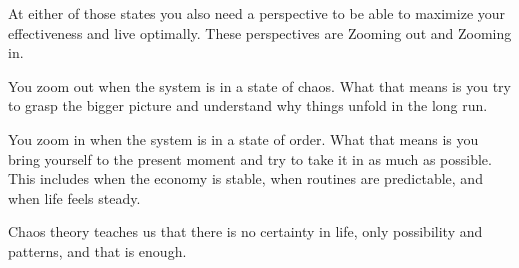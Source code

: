 \documentclass[12pt]{article}
\begin{document}
At either of those states you also need a perspective to be able to maximize your effectiveness and live optimally. These perspectives are Zooming out and Zooming in. 

You zoom out when the system is in a state of chaos. What that means is you try to grasp the bigger picture and understand why things unfold in the long run.

You zoom in when the system is in a state of order. What that means is you bring yourself to the present moment and try to take it in as much as possible. This includes when the economy is stable, when routines are predictable, and when life feels steady.

Chaos theory teaches us that there is no certainty in life, only possibility and patterns, and that is enough.


\nocite{*} 
 

\end{document}
